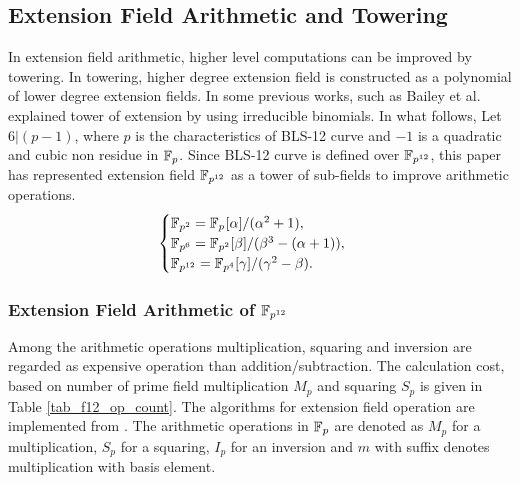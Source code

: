 \subsection{Extension Field Arithmetic and Towering}
In extension field arithmetic, higher level computations can be improved by towering. In towering, higher degree extension field is  constructed as a polynomial of lower degree extension fields.
In some previous works, such as Bailey et al. \cite{JC:BaiPaa01} explained tower of extension by using irreducible binomials. 
In what follows, Let $6|(p-1)$, where $p$ is the characteristics of BLS-12 curve and $-1$ is a quadratic and cubic non residue in ${\mathbb{F}}_{p}$. 
Since BLS-12 curve is defined over $\FPTV$, this paper has represented extension field  $\FPTV$ as a tower of sub-fields to improve arithmetic operations.
\begin{equation}\label{BN_towering}
\begin{cases}
{\mathbb{F}}_{p^{2}} = {\mathbb{F}}_{p^{}}[\alpha]/(\alpha^2+1),  \\ 
{\mathbb{F}}_{p^{6}} = {\mathbb{F}}_{p^{2}}[\beta]/(\beta^3-(\alpha+1)),  \\ 
{\mathbb{F}}_{p^{12}} = {\mathbb{F}}_{p^{4}}[\gamma]/(\gamma^2-\beta). \\ 
\end{cases}
\end{equation}

\subsubsection*{Extension Field Arithmetic of $\FPTV$}
Among the arithmetic operations multiplication, squaring and inversion are regarded as expensive operation than addition/subtraction. The calculation cost, based on number of prime field multiplication $M_p$ and squaring $S_p$ is given in Table \ref{tab_f12_op_count}. The algorithms for extension field operation are implemented from \cite{EPRINT:DEHR1}. The arithmetic operations in ${\mathbb{F}}_{p}$ are denoted as $M_p$ for a multiplication, $S_p$ for a squaring, $I_p$ for an inversion and $m$ with suffix denotes multiplication with basis element.

\begin{table*}[t]
\caption{Number of arithmetic operations in $\FPTV$ based on \eqref{BN_towering}}
\label{tab_f12_op_count}
\centering
{}
\end{table*}

